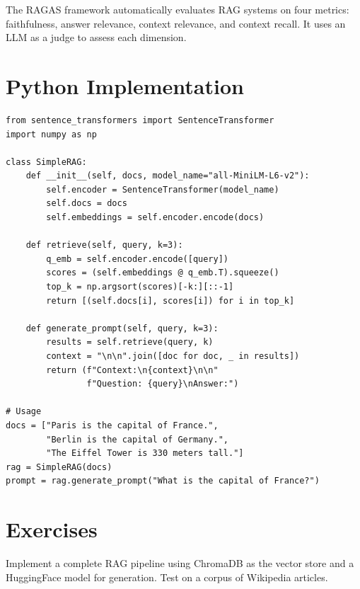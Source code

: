 \begin{example}
The RAGAS framework automatically evaluates RAG systems on four metrics:
faithfulness, answer relevance, context relevance, and context recall.
It uses an LLM as a judge to assess each dimension.
\end{example}

\section{Python Implementation}
\label{sec:rag:code}

\begin{codeblock}[title=\textbf{Minimal RAG Pipeline}]
\begin{verbatim}
from sentence_transformers import SentenceTransformer
import numpy as np

class SimpleRAG:
    def __init__(self, docs, model_name="all-MiniLM-L6-v2"):
        self.encoder = SentenceTransformer(model_name)
        self.docs = docs
        self.embeddings = self.encoder.encode(docs)

    def retrieve(self, query, k=3):
        q_emb = self.encoder.encode([query])
        scores = (self.embeddings @ q_emb.T).squeeze()
        top_k = np.argsort(scores)[-k:][::-1]
        return [(self.docs[i], scores[i]) for i in top_k]

    def generate_prompt(self, query, k=3):
        results = self.retrieve(query, k)
        context = "\n\n".join([doc for doc, _ in results])
        return (f"Context:\n{context}\n\n"
                f"Question: {query}\nAnswer:")

# Usage
docs = ["Paris is the capital of France.",
        "Berlin is the capital of Germany.",
        "The Eiffel Tower is 330 meters tall."]
rag = SimpleRAG(docs)
prompt = rag.generate_prompt("What is the capital of France?")
\end{verbatim}
\end{codeblock}

\section{Exercises}
\label{sec:rag:exercises}

\begin{exercise}
Implement a complete RAG pipeline using ChromaDB as the vector store and
a HuggingFace model for generation. Test on a corpus of Wikipedia
articles.
\end{exercise}

